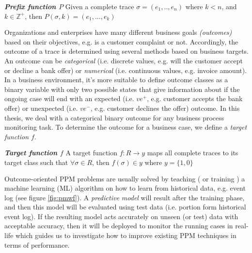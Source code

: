 \begin{definition}{\textit{\textbf{Prefix function $P$}}}
	Given a complete trace $\sigma = (e_1, .., e_n)$ where $k < n$, and $k \in \mathbb Z^+$, then $P(\sigma, k) = (e_1, ..., e_k)$
	
\end{definition}


Organizations and enterprises have many different business goals \textit{(outcomes)} based on their objectives, e.g. is a customer complaint or not. Accordingly, the outcome of a trace is determined using several methods based on business targets. An outcome can be \textit{categorical} (i.e. discrete values, e.g. will the customer accept or decline a bank offer) or \textit{numerical} (i.e. continuous values, e.g. invoice amount). In a business environment, it’s more suitable to define outcome classes as a binary variable with only two possible states that give information about if the ongoing case will end with an expected (i.e. $ve^{+}$, e.g. customer accepts the bank offer) or unexpected (i.e. $ve^{-}$, e.g. customer declines the offer)  outcome.  In this thesis, we deal with a categorical binary outcome for any business process monitoring task. To determine the outcome for a business case, we define a \textit{target function $f$}.

\begin{definition}{\textit{\textbf{Target function $f$}}}
	A target function $f: R \to y$ maps all complete traces to its target class such that $\forall \sigma \in R$, then $f(\sigma) \in y$ where $y=\{1,0\}$
	
\end{definition}

Outcome-oriented PPM problems are usually solved by teaching ( or training ) a machine learning (ML) algorithm on how to learn from historical data, e.g. event log (see figure \ref{fig:pmwf}). A \textit{predictive model} will result after the training phase, and then this model will be evaluated using test data (i.e. portion form historical event log). If the resulting model acts accurately on unseen (or test) data with acceptable accuracy, then it will be deployed to monitor the running cases in real-life which guides us to investigate how to improve existing PPM techniques in terms of performance. 


\newcommand{\quotes}[1]{``#1''}


